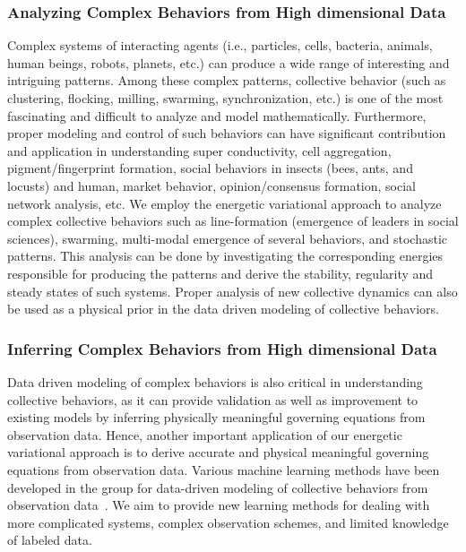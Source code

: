 \documentclass[11pt]{NSFamsart}
\begin{document}
\subsubsection*{Analyzing Complex Behaviors from High dimensional Data}
Complex systems of interacting agents (i.e., particles, cells, bacteria, animals, human beings, robots, planets, etc.) %
can produce a wide range of interesting and intriguing patterns.  Among these complex patterns, collective behavior (such as clustering, flocking, milling, swarming, synchronization, etc.) is one of the most fascinating and difficult to analyze and model mathematically.  Furthermore, proper modeling and control of such behaviors can have significant contribution and application in understanding super conductivity, cell aggregation, pigment/fingerprint formation, social behaviors in insects (bees, ants, and locusts) and human, market behavior, opinion/consensus formation, social network analysis, etc. We employ the energetic variational approach to analyze complex collective behaviors such as line-formation (emergence of leaders in social sciences), swarming, multi-modal emergence of several behaviors, and stochastic patterns.  This analysis can be done by investigating the corresponding energies responsible for producing the patterns and derive the stability, regularity and steady states of such systems.  Proper analysis of new collective dynamics can also be used as a physical prior in the data driven modeling of collective behaviors.

\subsubsection*{Inferring Complex Behaviors from High dimensional Data}
Data driven modeling of complex behaviors is also critical in understanding collective behaviors, as it can provide validation as well as improvement to existing models by inferring physically meaningful governing equations from observation data.  Hence, another important application of our energetic variational approach is to derive accurate and physical meaningful governing equations from observation data.  Various machine learning methods have been developed in the group for data-driven modeling of collective behaviors from observation data~\cite{LZTM2019, ZMM2020, MMQZ2021, FMMZ2022,MTZM2022, ZMM2023}.  We aim to provide new learning methods for dealing with more complicated systems, complex observation schemes, and limited knowledge of labeled data.
\end{document}

